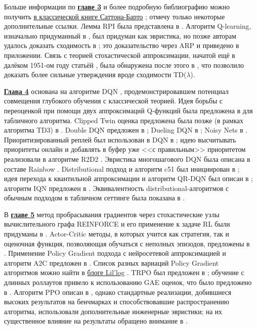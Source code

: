 Больше информации по \underline{\textbf{главе 3}} и более подробную библиографию можно получить \href{https://drive.google.com/file/d/1Z4W_-0IaMNpZnhnMkqcDVM_EA79GFJo-/view}{в классической книге Саттона-Барто} \cite{sutton2018reinforcement}; отмечу только некоторые дополнительные ссылки. Лемма RPI была представлена в \cite{kakade2002approximately}. Алгоритм Q-learning, изначально придуманный в \cite{watkins1989learning}, был придуман как эвристика, но позже авторам удалось доказать сходимость в \cite{watkins1992q}; это доказательство через ARP и приведено в приложении. Связь с теорией стохастической аппроксимации, начатой ещё в далёком 1951-ом году статьёй \cite{robbins1951stochastic}, была обнаружена после этого в \cite{tsitsiklis1994asynchronous}, что позволило доказать более сильные утверждения вроде сходимости TD($\lambda$).

\underline{\textbf{Глава 4}} основана на алгоритме DQN \cite{mnih2013playing}, продемонстрировавшем потенциал совмещения глубокого обучения с классической теорией. Идея борьбы с переоценкой при помощи двух аппроксимаций Q-функций была предложена в \cite{hasselt2010double} для табличного алгоритма. Clipped Twin оценка предложена была позже (в рамках алгоритма TD3) в \cite{fujimoto2018addressing}. Double DQN предложен в \cite{van2016deep}; Dueling DQN в \cite{wang2015dueling}; Noisy Nets в \cite{fortunato2017noisy}. Приоритизированный реплей был использован в DQN в \cite{schaul2015prioritized}; идею высчитывать приоритеты онлайн и добавлять в буфер уже <<с правильным>> приоритетом реализовали в алгоритме R2D2 \cite{horgan2018distributed}. Эвристика многошагового DQN была описана в составе Rainbow \cite{hessel2018rainbow}. Distributional подход и алгоритм c51 был инициирован в \cite{bellemare2017distributional}; идея перехода к квантильной аппроксимации и алгоритм QR-DQN был описан в \cite{dabney2018distributional}; алгоритм IQN предложен в \cite{dabney2018implicit}. Эквивалентность distributional-алгоритмов с обычным подходом в табличном сеттинге была показана в \cite{lyle2019comparative}.

В \underline{\textbf{главе 5}} метод пробрасывания градиентов через стохастические узлы вычислительного графа REINFORCE и его применение к задаче RL были придуманы в \cite{williams1992simple}. Actor-Critic методы, в которых учится как стратегия, так и оценочная функция, позволяющая обучаться с неполных эпизодов, предложены в \cite{sutton2000policy}. Применение Policy Gradient подхода с нейросетевой аппроксимацией и алгоритм A2C предложен в \cite{mnih2016asynchronous}. Список разных вариаций Policy Gradient алгоритмов можно найти в \href{https://lilianweng.github.io/lil-log/2018/04/08/policy-gradient-algorithms.html}{блоге Lil'log} \cite{weng2018PG}. TRPO был предложен в \cite{schulman2015trust}; обучение с длинных роллаутов привело к использованию GAE оценок, что было предложено в \cite{schulman2015high}. Алгоритм PPO описан в \cite{schulman2017proximal}, однако стандартные реализации, добившиеся высоких результатов на бенчмарках и способствовавшие распространению алгоритма, использовали дополнительные инженерные эвристики; на их существенное влияние на результаты обращено внимание в \cite{engstrom2019implementation}.

